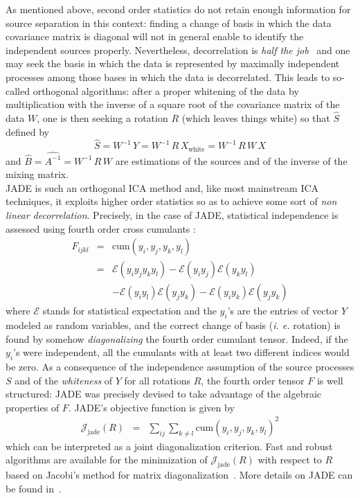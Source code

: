 As mentioned above, second order statistics do not retain enough information for source separation in this context: finding a change of 
basis in which the data covariance matrix is diagonal will not in general enable to identify the independent sources properly. Nevertheless, 
decorrelation is \emph{half the job}~\cite{ica:tutorial} and one may seek the basis in which the data is represented by maximally independent 
processes among those bases in which the data is decorrelated. This leads to so-called orthogonal algorithms: after a proper whitening of 
the data by multiplication with the inverse of a square root of the covariance matrix of the data $W$, one is then seeking a rotation $R$ 
(which leaves things white) so that $\hat{ S}$ defined by
\begin{equation}
\hat{ S} = W^{-1} \, Y =  W^{-1}\, R \, X_{\textrm{white}}  = W^{-1}\, R \, W \, X 
\end{equation}
and $\hat{B} = \widehat{A^{-1}} =  W^{-1}\, R \, W$ are estimations of the sources and of the inverse of the mixing matrix.\\

JADE is such an orthogonal ICA method and, like most mainstream ICA techniques, it exploits higher order statistics so as to achieve some 
sort of \emph{ non linear decorrelation}. Precisely, in the case of JADE, statistical independence is assessed using fourth order cross cumulants : 
\begin{eqnarray}  \nonumber	 
F_{ijkl} & = & \textrm{cum}( y_i, y_j, y_k, y_l )   \nonumber    \\
  & =& \mathcal{E} (y_i y_j y_k y_l) - \mathcal{E} (y_i y_j)\mathcal{E} (y_k y_l)\nonumber \\
  & & -\mathcal{E} (y_iy_l)\mathcal{E} ( y_j y_k)-\mathcal{E} (y_iy_k)\mathcal{E} (y_j y_k)
\end{eqnarray}
where $\mathcal{E}$ stands for statistical expectation and the $y_i$'s are the entries of vector $Y$ modeled as random variables, 
and the correct change of basis (\emph{i. e.} rotation) is found by somehow \emph{diagonalizing} the fourth order cumulant tensor. 
Indeed, if the $y_i$'s were independent, all the cumulants with at least two different indices would be zero. As a consequence of 
the independence assumption of the source processes $S$ and of the \emph{whiteness} of $Y$ for all rotations $R$, the fourth order 
tensor $F$ is well structured: JADE was precisely devised to take advantage of the algebraic properties of $F$. JADE's objective 
function is given by
\begin{eqnarray}  \nonumber	 
  \mathcal{J}_{\textrm{jade}}( R ) & =&  \sum _{ij}   \sum_{k \ne l} \textrm{cum}(  y_i, y_j, y_k, y_l )^2  
\end{eqnarray}
which can be interpreted as a joint diagonalization criterion. Fast and robust algorithms are available for the minimization 
of $\mathcal{J}_{\textrm{jade}}( R )$ with respect to $R$ based on Jacobi's method for matrix diagonalization~\cite{ica:pham2001}. 
More details on JADE can be found in~\cite{ica:jade,ica:tutorial,ica:icabook}.


